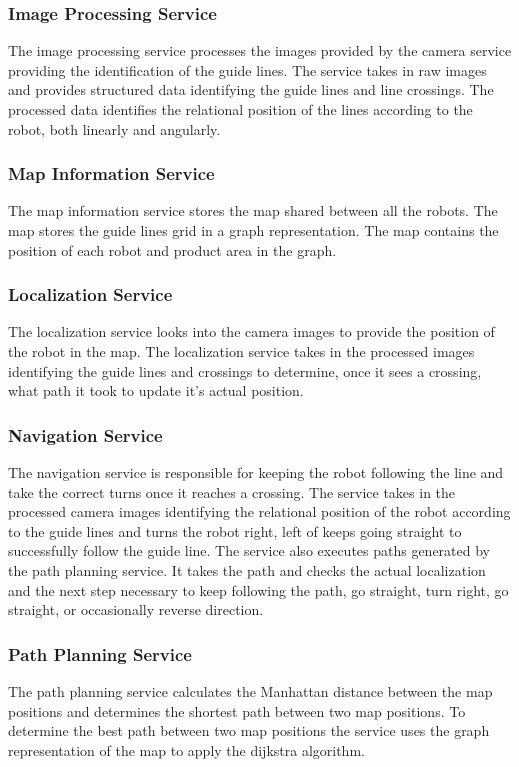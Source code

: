 \subsubsection*{Image Processing Service}
The image processing service processes the images provided by the camera service providing the identification of the guide lines. The service takes in raw images and provides structured data identifying the guide lines and line crossings. The processed data identifies the relational position of the lines according to the robot, both linearly and angularly.

\subsubsection*{Map Information Service}
The map information service stores the map shared between all the robots. The map stores the guide lines grid in a graph representation. The map contains the position of each robot and product area in the graph.

\subsubsection*{Localization Service}
The localization service looks into the camera images to provide the position of the robot in the map. The localization service takes in the processed images identifying the guide lines and crossings to determine, once it sees a crossing, what path it took to update it's actual position.

\subsubsection*{Navigation Service}
The navigation service is responsible for keeping the robot following the line and take the correct turns once it reaches a crossing. The service takes in the processed camera images identifying the relational position of the robot according to the guide lines and turns the robot right, left of keeps going straight to successfully follow the guide line. The service also executes paths generated by the path planning service. It takes the path and checks the actual localization and the next step necessary to keep following the path, go straight, turn right, go straight, or occasionally reverse direction.

\subsubsection*{Path Planning Service}
The path planning service calculates the Manhattan distance between the map positions and determines the shortest path between two map positions. To determine the best path between two map positions the service uses the graph representation of the map to apply the dijkstra algorithm.

